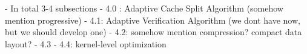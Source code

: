 - In total 3-4 subsections
- 4.0 : Adaptive Cache Split Algorithm (somehow mention progressive)
- 4.1: Adaptive Verification Algorithm (we dont have now, but we should develop one)
- 4.2: somehow mention compression? compact data layout?
- 4.3
- 4.4: kernel-level optimization